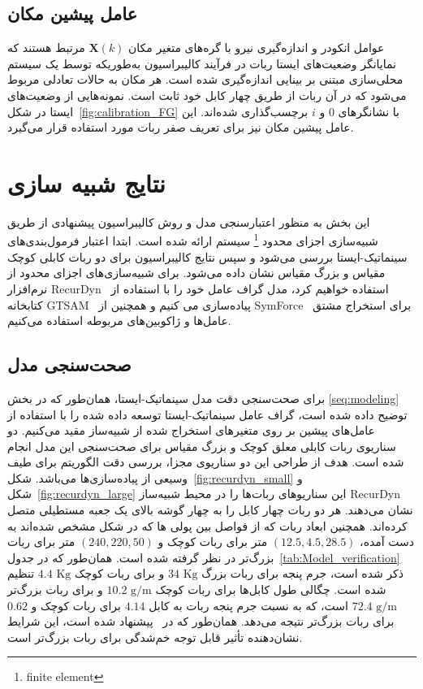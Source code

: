 \subsection{عامل پیشین مکان}
عوامل انکودر و اندازه‌گیری نیرو با گره‌های متغیر مکان $\bm{X}(k)$ مرتبط هستند که نمایانگر وضعیت‌های ایستا ربات در فرآیند کالیبراسیون به‌طوریکه توسط یک سیستم محلی‌سازی مبتنی بر بینایی اندازه‌گیری شده است. 
هر مکان به حالات تعادلی مربوط می‌شود که در آن ربات از طریق چهار کابل خود ثابت است. نمونه‌هایی از وضعیت‌های ایستا در شکل~\ref{fig:calibration_FG} با نشانگرهای $0$ و $i$ برچسب‌گذاری شده‌اند. این عامل پیشین  مکان نیز برای تعریف صفر ربات مورد استفاده قرار می‌گیرد.



\section{نتایج شبیه سازی} \label{sec:results}
این بخش به منظور اعتبارسنجی مدل و روش کالیبراسیون پیشنهادی از طریق شبیه‌سازی اجزای محدود
\footnote{finite element}
 سیستم ارائه شده است. ابتدا اعتبار فرمول‌بندی‌های سینماتیک-ایستا بررسی می‌شود و سپس نتایج کالیبراسیون برای دو ربات کابلی کوچک مقیاس و بزرگ مقیاس نشان داده می‌شود. برای شبیه‌سازی‌های اجزای محدود از نرم‌افزار RecurDyn~\cite{functionbay} استفاده خواهیم کرد، مدل گراف عامل خود را با استفاده از کتابخانه GTSAM~\cite{dellaert2012factor} پیاده‌سازی می کنیم و همچنین از SymForce~\cite{Martiros-RSS-22} برای استخراج مشتق عامل‌ها و ژاکوبین‌های مربوطه استفاده می‌کنیم.


\subsection{صحت‌سنجی مدل}
برای صحت‌سنجی دقت مدل سینماتیک-ایستا، همان‌طور که در بخش 
\ref{seq:modeling}
توضیح داده شده است، گراف عامل سینماتیک-ایستا توسعه داده شده را با استفاده از عامل‌های پیشین بر روی متغیرهای استخراج شده از شبیه‌ساز مقید می‌کنیم. دو سناریوی ربات کابلی معلق کوچک و بزرگ مقیاس برای صحت‌سنجی این مدل انجام شده است. هدف از طراحی این دو سناریوی مجزا، بررسی دقت الگوریتم برای طیف وسیعی از پیاده‌سازی‌ها می‌باشد. شکل~\ref{fig:recurdyn_small} و شکل~\ref{fig:recurdyn_large} این سناریوهای ربات‌ها را در محیط شبیه‌ساز RecurDyn نشان می‌دهند. هر دو ربات چهار کابل را به چهار گوشه بالای یک جعبه مستطیلی  متصل کرده‌اند. همچنین ابعاد ربات که از فواصل بین پولی ها که در شکل مشخص شده‌اند به دست آمده، $(12.5, 4.5, 28.5)$ متر برای ربات کوچک و $(240, 220, 50)$ متر برای ربات بزرگ‌تر در نظر گرفته شده است. همان‌طور که در جدول~\ref{tab:Model_verification} ذکر شده است، جرم پنجه برای ربات بزرگ $34 \text{ Kg}$ و برای ربات کوچک $4.4 \text{ Kg}$ تنظیم شده است. چگالی طول کابل‌ها برای ربات کوچک $10.2 \text{ g/m}$ و برای ربات بزرگ‌تر $72.4 \text{ g/m}$ است، که به نسبت جرم پنجه ربات به کابل $4.14$ برای ربات کوچک و $0.62$ برای ربات بزرگ‌تر نتیجه می‌دهد. همان‌طور که در~\cite{pott2013cable} پیشنهاد شده است، این شرایط نشان‌دهنده تأثیر قابل توجه خم‌شدگی برای ربات بزرگ‌تر است.


